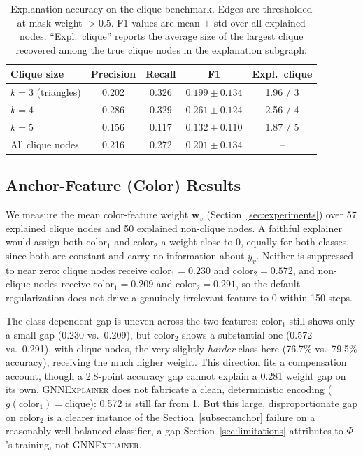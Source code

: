 \documentclass{article}
\newcommand{\GNNEx}{\textsc{GNNExplainer}\xspace}
\newcommand{\bfw}{\mathbf{w}}
\theoremstyle{definition}
\begin{document}
\begin{table}[t]
  \centering
  \caption{Explanation accuracy on the clique benchmark.
    Edges are thresholded at mask weight $>0.5$.
    F1 values are mean $\pm$ std over all explained nodes.
    ``Expl.\ clique'' reports the average size of the largest clique
    recovered among the true clique nodes in the explanation subgraph.}
  \label{tab:results}
  \smallskip
  \begin{tabular}{lcccc}
    \toprule
    Clique size & Precision & Recall & F1 & Expl.\ clique \\
    \midrule
    $k=3$ (triangles)  & 0.202 & 0.326 & $0.199 \pm 0.134$ & 1.96 / 3 \\
    $k=4$              & 0.286 & 0.329 & $0.261 \pm 0.124$ & 2.56 / 4 \\
    $k=5$              & 0.156 & 0.117 & $0.132 \pm 0.110$ & 1.87 / 5 \\
    All clique nodes   & 0.216 & 0.272 & $0.201 \pm 0.134$ & -- \\
    \bottomrule
  \end{tabular}
\end{table}

\subsection{Anchor-Feature (Color) Results}
\label{subsec:anchor_results}

We measure the mean color-feature weight $\bfw_v$ (Section~\ref{sec:experiments})
over 57 explained clique nodes and 50 explained non-clique nodes. A faithful
explainer would assign both $\text{color}_1$ and $\text{color}_2$ a weight
close to 0, equally for both classes, since both are constant and carry no
information about $y_v$. Neither is suppressed to near zero: clique nodes
receive $\text{color}_1=0.230$ and $\text{color}_2=0.572$, and non-clique
nodes receive $\text{color}_1=0.209$ and $\text{color}_2=0.291$, so the
default regularization does not drive a genuinely irrelevant feature to 0
within 150 steps.

The class-dependent gap is uneven across the two features: $\text{color}_1$
still shows only a small gap (0.230 vs.\ 0.209), but $\text{color}_2$ shows
a substantial one (0.572 vs.\ 0.291), with clique nodes, the very slightly
\emph{harder} class here (76.7\% vs.\ 79.5\% accuracy), receiving the much
higher weight. This direction fits a compensation account, though a
2.8-point accuracy gap cannot explain a 0.281 weight gap on its own.
\GNNEx does not fabricate a clean, deterministic encoding
($g(\text{color}_1){=}\text{clique}$): 0.572 is still far from 1. But this
large, disproportionate gap on $\text{color}_2$ is a clearer instance of
the Section~\ref{subsec:anchor} failure on a reasonably well-balanced
classifier, a gap Section~\ref{sec:limitations} attributes to
$\Phi$'s training, not \GNNEx.
\end{document}

